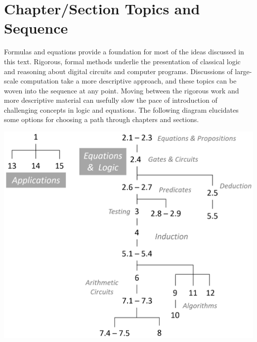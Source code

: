 \chapter{Chapter/Section Topics and Sequence}
\label{ch:roadmap}

Formulas and equations provide a foundation
for most of the ideas discussed in this text.
Rigorous, formal methods underlie the presentation of classical logic
and reasoning about digital circuits and computer programs.
Discussions of large-scale computation take a more descriptive approach,
and these topics can be woven into the sequence at any point.
Moving between the rigorous work and more descriptive material
can usefully slow the pace of introduction 
of challenging concepts in logic and equations.
The following diagram elucidates some options for choosing a
path through chapters and sections.
\vspace{1cm}
\label{diagram:roadmap}
\begin{center}
\includegraphics[scale=0.25]{images/roadmap.png}
\end{center}


